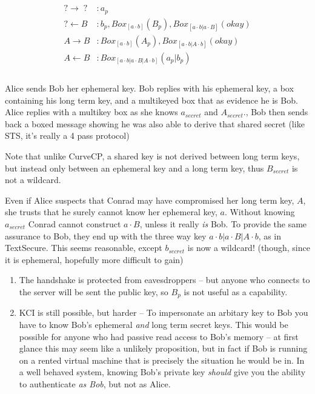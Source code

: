 \documentclass[12pt]{article}
\begin{document}
$$
\begin{align*}
\\
    ? \to \;?\; &: a_p \\
    ? \gets B &: b_p, Box_{[a\cdot b]}(B_p), Box_{[a\cdot b|a\cdot B]}(okay) \\
    A \to B &: Box_{[a\cdot b]}(A_p), Box_{[a\cdot b|A\cdot b]}(okay) \\
    A \gets B &: Box_{[a \cdot b | a \cdot B | A \cdot b]}(a_p|b_p)\\
\\
\end{align*}
$$

Alice sends Bob her ephemeral key. Bob replies with his ephemeral key,
a box containing his long term key, and a multikeyed box that as
evidence he is Bob. Alice replies with
a multikey box as she knows $a_{secret}$ and $A_{secret}$.,
Bob then sends back a boxed message showing he was also able
to derive that shared secret (like STS, it's really a 4 pass protocol)

Note that unlike CurveCP, a shared key is not derived between long term
 keys, but instead only between an ephemeral key and a long term key,
thus $B_{secret}$ is not a wildcard.

Even if Alice suspects that Conrad may have compromised her long term
key, $A$, she trusts that he surely cannot know her ephemeral key, $a$.
Without knowing $a_{secret}$ Conrad cannot construct $a\cdot B$, unless
it really \emph{is} Bob. To provide the same assurance to Bob,
they end up with the three way key $a \cdot b | a \cdot B | A \cdot b$,
as in TextSecure\cite{textsecure}. This seems reasonable,
except $b_{secret}$ is now a wildcard! (though, since it is ephemeral,
hopefully more difficult to gain)

\begin{enumerate}
  \item The handshake is protected from eavesdroppers -- but
  anyone who connects to the server will be sent the public key,
  so $B_p$ is not useful as a capability.

  \item KCI is still possible, but harder -- To impersonate an
  arbitary key to Bob you have to know Bob's ephemeral \emph{and} long
  term secret keys. This would be possible for anyone who had
  passive read access to Bob's memory -- at first
  glance this may seem like a unlikely proposition, but in fact
  if Bob is running on a rented virtual machine that
  is precisely the situation he would be in.
  In a well behaved system, knowing Bob's private key \emph{should}
  give you the ability to authenticate \emph{as Bob}, but not as Alice.
\end{enumerate}
\end{document}
